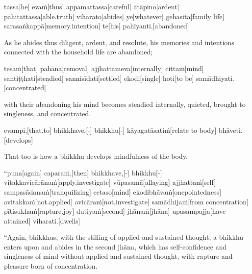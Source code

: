 \begin{samepage}
\begingl[glneveryline={\PaliGlossA,\PaliGlossB}]
tassa[he] evaṁ[thus] appamattassa[careful] ātāpino[ardent] pahitattassa[able.truth] viharato[abides] ye[whatever] gehasitā[family life] sarasaṅkappā[memory.intention] te[his] pahīyanti.[abandoned]
\endgl
\nopagebreak
\linespread{0.5}
\begin{spacin}{0.2}
{\PaliGlossFT As he abides thus diligent, ardent, and resolute, his memories and intentions connected with the household life are abandoned;}
\end{spacin}
\vskip 12pt
\end{samepage}
\begin{samepage}
\begingl[glneveryline={\PaliGlossA,\PaliGlossB}]
tesaṁ[that] pahānā[removal] ajjhattameva[internally] cittaṁ[mind] santiṭṭhati[steadied] sannisīdati[settled] ekodi[single] hoti[to be] samādhiyati.[concentrated]
\endgl
\nopagebreak
\linespread{0.5}
\begin{spacin}{0.2}
{\PaliGlossFT with their abandoning his mind becomes steadied internally, quieted, brought to singleness, and concentrated.}
\end{spacin}
\vskip 12pt
\end{samepage}
\begin{samepage}
\begingl[glneveryline={\PaliGlossA,\PaliGlossB}]
evampi,[that.to] bhikkhave,[-] bhikkhu[-] kāyagatāsatiṁ[relate to body] bhāveti.[develops]
\endgl
\nopagebreak
\linespread{0.5}
\begin{spacin}{0.2}
{\PaliGlossFT That too is how a bhikkhu develops mindfulness of the body.}
\end{spacin}
\vskip 12pt
\end{samepage}
\vskip 0.05in
\begin{samepage}
\begingl[glneveryline={\PaliGlossA,\PaliGlossB}]
“puna[again] caparaṁ,[then] bhikkhave,[-] bhikkhu[-] vitakkavicārānaṁ[apply.investigate] vūpasamā[allaying] ajjhattaṁ[self] sampasādanaṁ[tranquilizing] cetaso[mind] ekodibhāvaṁ[onepointedness] avitakkaṁ[not.applied] avicāraṁ[not.investigate] samādhijaṁ[from concentration] pītisukhaṁ[rapture.joy] dutiyaṁ[second] jhānaṁ[jhāna] upasampajja[have attained] viharati.[dwells]
\endgl
\nopagebreak
\linespread{0.5}
\begin{spacin}{0.2}
{\PaliGlossFT “Again, bhikkhus, with the stilling of applied and sustained thought, a bhikkhu enters upon and abides in the second jhāna, which has self-confidence and singleness of mind without applied and sustained thought, with rapture and pleasure born of concentration.}
\end{spacin}
\vskip 12pt
\end{samepage}
